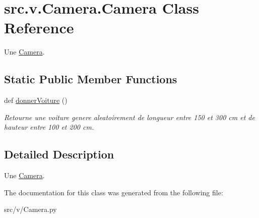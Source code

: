 \hypertarget{classsrc_1_1v_1_1_camera_1_1_camera}{}\section{src.\+v.\+Camera.\+Camera Class Reference}
\label{classsrc_1_1v_1_1_camera_1_1_camera}


Une \hyperlink{classsrc_1_1v_1_1_camera_1_1_camera}{Camera}.  


\subsection*{Static Public Member Functions}
\begin{DoxyCompactItemize}
\item 
\hypertarget{classsrc_1_1v_1_1_camera_1_1_camera_ac2609da68d2be35c5d8919e933279fa2}{}def \hyperlink{classsrc_1_1v_1_1_camera_1_1_camera_ac2609da68d2be35c5d8919e933279fa2}{donner\+Voiture} ()\label{classsrc_1_1v_1_1_camera_1_1_camera_ac2609da68d2be35c5d8919e933279fa2}

\begin{DoxyCompactList}\small\item\em Retourne une voiture genere aleatoirement de longueur entre 150 et 300 cm et de hauteur entre 100 et 200 cm. \end{DoxyCompactList}\end{DoxyCompactItemize}


\subsection{Detailed Description}
Une \hyperlink{classsrc_1_1v_1_1_camera_1_1_camera}{Camera}. 

The documentation for this class was generated from the following file\+:\begin{DoxyCompactItemize}
\item 
src/v/Camera.\+py\end{DoxyCompactItemize}
